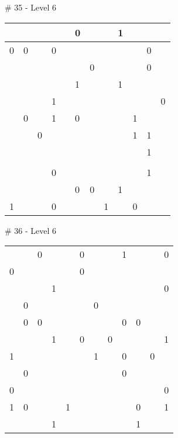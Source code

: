 \medskip

\# 35 - Level 6 \newline
\begin{tabular}{|m{\collen}|m{\collen}|m{\collen}|m{\collen}|m{\collen}|m{\collen}|m{\collen}|m{\collen}|m{\collen}|m{\collen}|m{\collen}|m{\collen}|}
\hline
    &   &   &   &   & 0 &   &   & 1 &   &   &   \\
\hline
  0 & 0 &   & 0 &   &   &   &   &   &   & 0 &   \\
\hline
    &   &   &   &   &   & 0 &   &   &   & 0 &   \\
\hline
    &   &   &   &   & 1 &   &   & 1 &   &   &   \\
\hline
    &   &   & 1 &   &   &   &   &   &   &   & 0 \\
\hline
    & 0 &   & 1 &   & 0 &   &   &   & 1 &   &   \\
\hline
    &   & 0 &   &   &   &   &   &   & 1 & 1 &   \\
\hline
    &   &   &   &   &   &   &   &   &   & 1 &   \\
\hline
    &   &   &   &   &   &   &   &   &   &   &   \\
\hline
    &   &   & 0 &   &   &   &   &   &   & 1 &   \\
\hline
    &   &   &   &   & 0 & 0 &   & 1 &   &   &   \\
\hline
  1 &   &   & 0 &   &   &   & 1 &   & 0 &   &   \\
\hline
\end{tabular}


\medskip

\# 36 - Level 6 \newline
\begin{tabular}{|m{\collen}|m{\collen}|m{\collen}|m{\collen}|m{\collen}|m{\collen}|m{\collen}|m{\collen}|m{\collen}|m{\collen}|m{\collen}|m{\collen}|}
\hline
    &   &   &   &   &   &   &   &   &   &   &   \\
\hline
    &   & 0 &   &   & 0 &   &   & 1 &   &   & 0 \\
\hline
  0 &   &   &   &   & 0 &   &   &   &   &   &   \\
\hline
    &   &   & 1 &   &   &   &   &   &   &   & 0 \\
\hline
    & 0 &   &   &   &   & 0 &   &   &   &   &   \\
\hline
    & 0 & 0 &   &   &   &   &   & 0 & 0 &   &   \\
\hline
    &   &   & 1 &   & 0 &   & 0 &   &   &   & 1 \\
\hline
  1 &   &   &   &   &   & 1 &   & 0 &   & 0 &   \\
\hline
    & 0 &   &   &   &   &   &   & 0 &   &   &   \\
\hline
  0 &   &   &   &   &   &   &   &   &   &   & 0 \\
\hline
  1 & 0 &   &   & 1 &   &   &   &   & 0 &   & 1 \\
\hline
    &   &   & 1 &   &   &   &   &   & 1 &   &   \\
\hline
\end{tabular}


